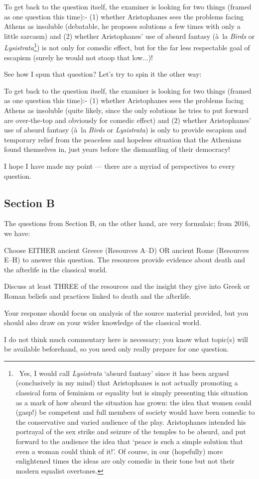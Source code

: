 \documentclass[a4paper,10pt]{article}
\begin{document}
To get back to the question itself, the examiner is looking for two things (framed as one question this time):- (1) whether Aristophanes
sees the problems facing Athens as insoluble (debatable, he proposes solutions a few times with only a little sarcasm) and (2) whether
Aristophanes' use of absurd fantasy (\`a~la \textit{Birds} or \textit{Lysistrata}\footnote{~Yes, I would call \textit{Lysistrata} `absurd
fantasy' since it has been argued (conclusively in my mind) that Aristophanes is not actually promoting a classical form of feminism or
equality but is simply presenting this situation as a mark of how absurd the situation has grown: the idea that women could (gasp!) be
competent and full members of society would have been comedic to the conservative and varied audience of the play. Aristophanes intended
his portrayal of the sex strike and seizure of the temples to be absurd, and put forward to the audience the idea that `peace is such a
simple solution that even a woman could think of it!'. Of course, in our (hopefully) more enlightened times the ideas are only comedic in
their tone but not their modern equalist overtones.}) is not only for comedic effect, but for the far less respectable goal of escapism (surely
he would not stoop that low...)!

See how I spun that question? Let's try to spin it the other way:

To get back to the question itself, the examiner is looking for two things (framed as one question this time):- (1) whether Aristophanes
sees the problems facing Athens as insoluble (quite likely, since the only solutions he tries to put forward are over-the-top and obviously
for comedic effect) and (2) whether Aristophanes' use of absurd fantasy (\`a~la \textit{Birds} or \textit{Lysistrata}) is only to provide
escapism and temporary relief from the peaceless and hopeless situation that the Athenians found themselves in, just years before the
dismantling of their democracy!

I hope I have made my point --- there are a myriad of perspectives to every question.

\subsection{Section B}
The questions from Section B, on the other hand, are very formulaic; from 2016, we have:
\begin{mdframed}
  Choose EITHER ancient Greece (Resources A–D) OR ancient Rome (Resources E–H) to answer this
  question. The resources provide evidence about death and the afterlife in the classical world.

  Discuss at least THREE of the resources and the insight they give into Greek or Roman beliefs and
  practices linked to death and the afterlife.

  Your response should focus on analysis of the source material provided, but you should also draw on
  your wider knowledge of the classical world.
\end{mdframed}
I do not think much commentary here is necessary; you know what topic(s) will be available beforehand,
so you need only really prepare for one question.
\end{document}
